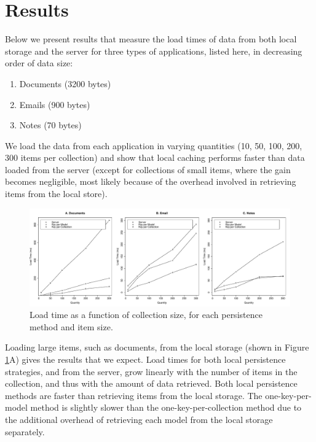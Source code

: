 \documentclass[12pt]{article}
\begin{document}
\section{Results}

Below we present results that measure the load times of data from both local
storage and the server for three types of applications, listed here, in
decreasing order of data size:

\begin{enumerate}
\item Documents (3200 bytes)
\item Emails (900 bytes)
\item Notes (70 bytes)
\end{enumerate}

We load the data from each application in varying quantities (10, 50, 100, 200,
300 items per collection) and show that local caching performs faster than data
loaded from the server (except for collections of small items, where the gain
becomes negligible, most likely because of the overhead involved in retrieving
items from the local store).

\begin{figure}[th]
  \centering
  \includegraphics[width=\textwidth]{lines.pdf}
  \caption{Load time as a function of collection size, for each persistence
  method and item size.}
  \label{fig:line}
\end{figure}

Loading large items, such as documents, from the local storage (shown in Figure
\ref{fig:line}A) gives the results that we expect. Load times for both
local persistence strategies, and from the server, grow linearly with the number of
items in the collection, and thus with the amount of data retrieved. Both local
persistence methods are faster than retrieving items from the local storage.
The one-key-per-model method is slightly slower than the one-key-per-collection
method due to the additional overhead of retrieving each model from the local
storage separately.
\end{document}
